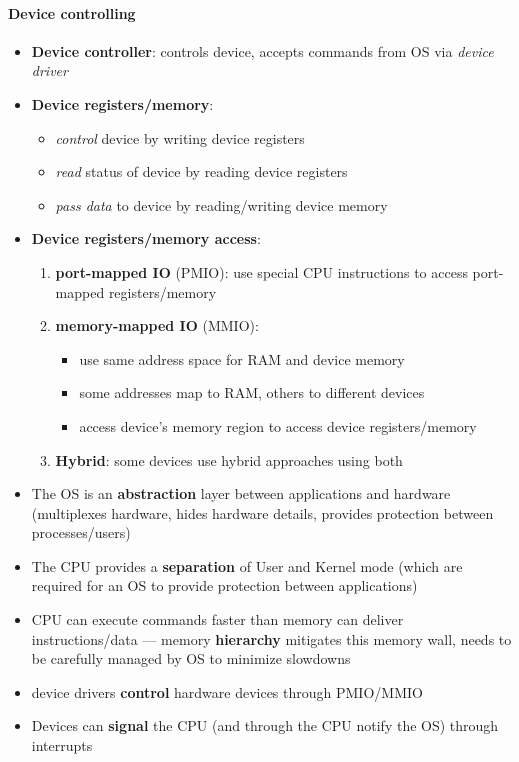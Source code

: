 \paragraph{Device controlling}
\begin{itemize}
	\item \textbf{Device controller}: controls device, accepts commands from OS via \emph{device driver}
	\item \textbf{Device registers/memory}:
	\begin{itemize}
		\item \emph{control} device by writing device registers
		\item \emph{read} status of device by reading device registers
		\item \emph{pass data} to device by reading/writing device memory
	\end{itemize}
	\item \textbf{Device registers/memory access}:
	\begin{enumerate}
		\item \textbf{port-mapped IO} (PMIO): use special CPU instructions to access port-mapped registers/memory
		\item \textbf{memory-mapped IO} (MMIO):
		\begin{itemize}
			\item use same address space for RAM and device memory
			\item some addresses map to RAM, others to different devices
			\item access device's memory region to access device registers/memory
		\end{itemize}
		\item \textbf{Hybrid}: some devices use hybrid approaches using both
	\end{enumerate}
\end{itemize}

\begin{summary}
	\begin{itemize}
		\item The OS is an \textbf{abstraction} layer between applications and hardware (multiplexes hardware, hides hardware details, provides protection between processes/users)
		\item The CPU provides a \textbf{separation} of User and Kernel mode (which are required for an OS to provide protection between applications)
		\item CPU can execute commands faster than memory can deliver instructions/data --- memory \textbf{hierarchy} mitigates this memory wall, needs to be carefully managed by OS to minimize slowdowns
		\item device drivers \textbf{control} hardware devices through PMIO/MMIO
		\item Devices can \textbf{signal} the CPU (and through the CPU notify the OS) through interrupts
	\end{itemize}
\end{summary}
